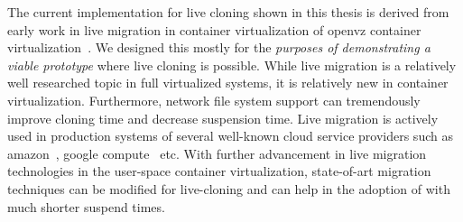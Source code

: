 \begin{itemize}
	The current implementation for live cloning shown in this thesis is derived from early work in live migration in container virtualization of openvz container virtualization~\cite{vzctl}. 
	We designed this mostly for the \emph{purposes of demonstrating a viable prototype} where live cloning is possible.
	While live migration is a relatively well researched topic in full virtualized systems, it is relatively new in container virtualization.
	Furthermore, network file system support can tremendously improve cloning time and decrease suspension time.
	Live migration is actively used in production systems of several well-known cloud service providers such as amazon~\cite{ec2}, google compute~\cite{gcompute} etc.
	With further advancement in live migration technologies in the user-space container virtualization, state-of-art migration techniques can be modified for live-cloning and can help in the adoption of \parikshan with much shorter suspend times.
	

\end{itemize}

